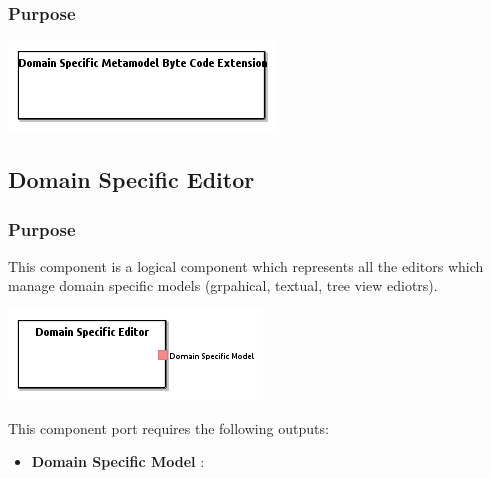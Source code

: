 \documentclass{gemoc} %
\begin{document}

\subsubsection{Purpose}

\begin{center}
\includegraphics*[trim=0.0cm 0.0cm 0cm 0.0cm, clip=true]{../images/generated/Generated_Domain_Specific_Metamodel_Byte_Code_Extension.png}
\end{center}



\subsection{Domain Specific Editor}


\subsubsection{Purpose}
This component is a logical component which represents all the editors which manage domain specific models (grpahical, textual, tree view ediotrs).
\begin{center}
\includegraphics*[trim=0.0cm 0.0cm 0cm 0.0cm, clip=true]{../images/generated/Generated_Domain_Specific_Editor.png}
\end{center}


This component port requires the following outputs:
\begin{itemize}
  \item \textbf{Domain Specific Model} :
\end{itemize}
\end{document}
